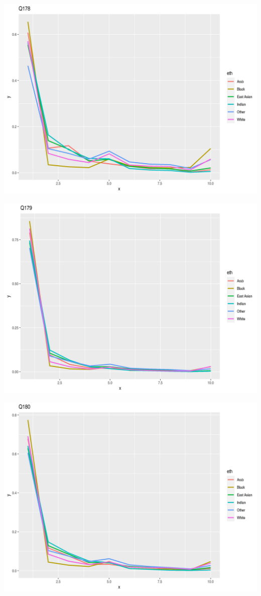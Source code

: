 \documentclass{amsart}
\begin{document}
\includegraphics[scale=0.7]{q178.jpeg}


\includegraphics[scale=0.7]{q179.jpeg}

\includegraphics[scale=0.7]{q180.jpeg}
\end{document}
